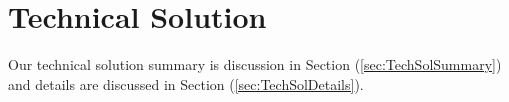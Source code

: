 \section{Technical Solution}
Our technical solution summary is discussion in Section (\ref{sec:TechSolSummary}) and details are discussed in Section (\ref{sec:TechSolDetails}).






